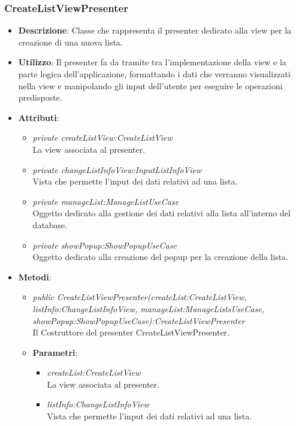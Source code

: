 \subsubsection{CreateListViewPresenter}
\begin{itemize}
\item \textbf{Descrizione}: Classe che rappresenta il presenter dedicato alla view per la creazione di una nuova lista.
\item \textbf{Utilizzo}: Il presenter fa da tramite tra l'implementazione della view e la parte logica dell'applicazione, formattando i dati che verranno visualizzati nella view e manipolando gli input dell'utente per eseguire le operazioni predisposte.
\item \textbf{Attributi}: 
	\begin{itemize}
	\item \textit{private createListView:CreateListView}\\
	La view associata al presenter.
	\item \textit{private changeListInfoView:InputListInfoView}\\
	Vista che permette l'input dei dati relativi ad una lista.
	\item \textit{private manageList:ManageListUseCase}\\
	Oggetto dedicato alla gestione dei dati relativi alla lista all'interno del database.
	\item \textit{private showPopup:ShowPopupUseCase}\\
	Oggetto dedicato alla creazione del popup per la creazione della lista.
	\end{itemize}
\item \textbf{Metodi}:
	\begin{itemize}
	\item \textit{public CreateListViewPresenter(createList:CreateListView, listInfo:ChangeListInfoView, manageList:ManageListsUseCase, showPopup:ShowPopupUseCase):CreateListViewPresenter}\\
		Il Costruttore del presenter CreateListViewPresenter.
		\item{\textbf{Parametri}: \begin{itemize}
		\item \textit{createList:CreateListView}\\
			La view associata al presenter.
		\item \textit{listInfo:ChangeListInfoView}\\
			Vista che permette l'input dei dati relativi ad una lista.

\end{itemize}}
\end{itemize}
\end{itemize}
